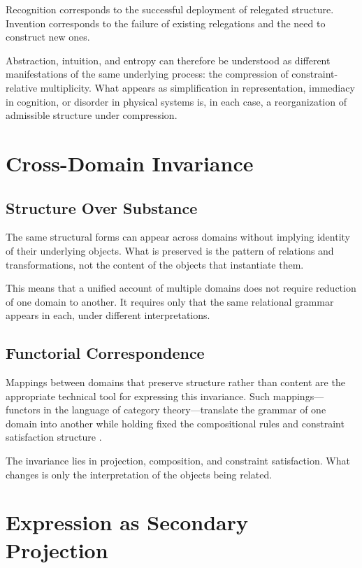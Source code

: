 \documentclass[11pt]{article}
\theoremstyle{plain}
\theoremstyle{definition}
\theoremstyle{remark}
\begin{document}
Recognition corresponds to the successful deployment of relegated
structure. Invention corresponds to the failure of existing relegations
and the need to construct new ones.

Abstraction, intuition, and entropy can therefore be understood as
different manifestations of the same underlying process: the compression
of constraint-relative multiplicity. What appears as simplification in
representation, immediacy in cognition, or disorder in physical systems
is, in each case, a reorganization of admissible structure under
compression.

\section{Cross-Domain Invariance}

\subsection{Structure Over Substance}

The same structural forms can appear across domains without implying
identity of their underlying objects. What is preserved is the pattern
of relations and transformations, not the content of the objects that
instantiate them.

This means that a unified account of multiple domains does not require
reduction of one domain to another. It requires only that the same
relational grammar appears in each, under different interpretations.

\subsection{Functorial Correspondence}

Mappings between domains that preserve structure rather than content
are the appropriate technical tool for expressing this invariance.
Such mappings---functors in the language of category theory---translate
the grammar of one domain into another while holding fixed the
compositional rules and constraint satisfaction structure
\cite{maclane1998categories,spivak2014category,baez2011physics}.

The invariance lies in projection, composition, and constraint
satisfaction. What changes is only the interpretation of the objects
being related.

\section{Expression as Secondary Projection}
\end{document}
